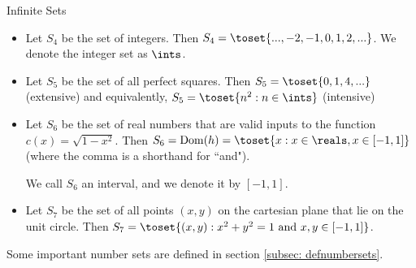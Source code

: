 \begin{expl}{Infinite Sets}
  \begin{itemize}
    \item Let $S_4$ be the set of integers. Then
    $S_4 = \toset{..., -2, -1, 0, 1, 2, ...}$. We denote the integer set
    as $\ints$.

    \item Let $S_5$ be the set of all perfect squares. Then
    $S_5 = \toset{0, 1, 4, ...}$ (extensive) and equivalently,
    $S_5 = \toset{n^2 : n \in \ints }$ (intensive)

    \item Let $S_6$ be the set of real numbers that are valid inputs to the
    function $c(x) = \sqrt{1 - x^2}$. Then $S_6 = \dom(h) = \toset{x : x \in
    \reals, x \in [-1, 1]}$ (where the comma is a shorthand for ``and").

    We call $S_6$ an interval, and we denote it by $[-1, 1]$.

    \item Let $S_7$ be the set of all points $(x, y)$ on the cartesian plane
    that lie on the unit circle. Then $S_7 = \toset{ (x, y) :
    x^2 + y^2 = 1 \text{ and } x, y \in [-1, 1]}$.
  \end{itemize}
\end{expl}

Some important number sets are defined in section \ref{subsec: defnumbersets}.
